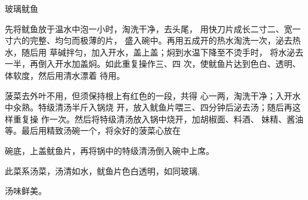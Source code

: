 \begin{recipe}{玻璃鱿鱼}

\ingredients


\cooking

\step 	先将鱿鱼放于温水中泡一小时，淘洗干净，去头尾， 用快刀片成长二寸二、宽一寸六的完整、均匀而极薄的片， 盛入碗中。再用五成开的热水淘洗一次，泌去热水，随后用 草碱拌匀，加入开水，盖上盖；焖到水温下降至不烫手时， 将水泌去一半，再倒入开水加盖焖。如此重复操作三、四 次，使鱿鱼片达到色白、透明、体软度，然后用清水漂着 待用。

\step 	菠菜去外叶不用，但须保持根上有红色的一段，共得 心一两，淘洗干净；入开水中汆熟。特级清汤半斤入锅烧 开，放入鱿鱼片喂三、四分钟后泌去汤；随后再这样重复操 作一次。然后将特级清汤放入锅中烧开，加胡椒面、料酒、 妹精、酱油等。最后用精致汤碗一个，将汆好的菠菜心放在

碗底，上盖鱿鱼片，再将锅中的特级清汤倒入碗中上席。

\notes

此菜系汤菜，汤清如水，鱿鱼片色白透明，如同玻璃,

汤味鲜美。

\end{recipe}

